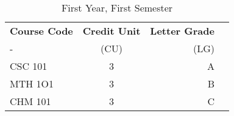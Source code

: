 \documentclass{article}
\begin{document}
	
\begin{table}[h!]
	\begin{center}
		\caption{First Year, First Semester}
		\label{tab:table1}
		\begin{tabular}{l|c|r|c}
			\textbf{Course Code} & \textbf{Credit Unit} & \textbf{Letter Grade}\\
			- & (CU) & (LG) \\
			\hline
			CSC 101 & 3 & A\\
			MTH 1O1 & 3 & B\\
			CHM 101 & 3 & C\\
		\end{tabular}
	\end{center}
\end{table}
\end{document}
